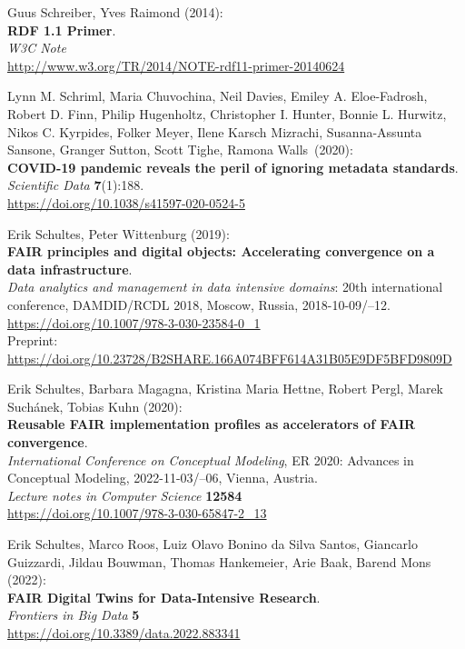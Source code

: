 \begin{thebibliography}{9}
Guus Schreiber, Yves Raimond (2014):\\
\textbf{RDF 1.1 Primer}. \\
\emph{W3C Note} \\
\url{http://www.w3.org/TR/2014/NOTE-rdf11-primer-20140624}

Lynn M. Schriml, Maria Chuvochina, Neil Davies, Emiley A.
Eloe-Fadrosh, Robert D. Finn, Philip Hugenholtz, Christopher I. Hunter,
Bonnie L. Hurwitz, Nikos C. Kyrpides, Folker Meyer, Ilene Karsch
Mizrachi, Susanna-Assunta Sansone, Granger Sutton, Scott Tighe, Ramona
Walls~(2020):\\
\textbf{COVID-19 pandemic reveals the peril of ignoring metadata
standards}.\\
\emph{Scientific Data} \textbf{7}(1):188.\\
\url{https://doi.org/10.1038/s41597-020-0524-5}

Erik Schultes, Peter Wittenburg (2019): \\
\textbf{FAIR principles and digital objects: Accelerating convergence on a data infrastructure}.\\
\emph{Data analytics and management in data intensive domains}: 20th international conference,
{DAMDID}/{RCDL} 2018, Moscow, Russia, 2018-10-09/--12. \\
\url{https://doi.org/10.1007/978-3-030-23584-0_1}\\
Preprint: \url{https://doi.org/10.23728/B2SHARE.166A074BFF614A31B05E9DF5BFD9809D}

Erik Schultes, Barbara Magagna, Kristina Maria Hettne, Robert Pergl,
Marek Suchánek, Tobias Kuhn (2020): \\
\textbf{Reusable {FAIR} implementation profiles as accelerators of {FAIR} convergence}.\\
\emph{International Conference on Conceptual Modeling}, ER 2020: Advances in Conceptual Modeling, 2022-11-03/--06, Vienna, Austria. \\
\emph{Lecture notes in Computer Science} \textbf{12584} \\ 
\url{https://doi.org/10.1007/978-3-030-65847-2_13}

Erik Schultes, Marco Roos, Luiz Olavo Bonino da Silva Santos, Giancarlo Guizzardi, Jildau Bouwman, Thomas Hankemeier, Arie Baak, Barend Mons (2022):\\
\textbf{FAIR Digital Twins for Data-Intensive Research}.\\
\emph{Frontiers in Big Data} \textbf{5}\\
\url{https://doi.org/10.3389/data.2022.883341}


\end{thebibliography}
